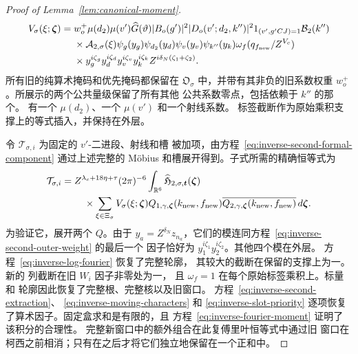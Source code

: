 \documentclass[11pt,a4paper]{article}
\numberwithin{equation}{section}
\numberwithin{figure}{section}
\theoremstyle{definition}
\theoremstyle{remark}
\begin{document}
\begin{proof}[Proof of Lemma~\ref{lem:canonical-moment}]
\begin{equation}
 \begin{split}
 V_\sigma(\xi;\boldsymbol\zeta)={}&w_o^+\mu(d_2)\mu(v')\widehat G(\vartheta)
 |B_o(g')|^2|D_o(v';d_2,k'')|^2
 1_{(v',g'CJ)=1}\mathcal B_2(k'')\\
 &\times\mathcal A_{2,\sigma}(\xi)
 \psi_g(y_g)\psi_{d_2}(y_d)\psi_v(y_v)\psi_{k''}(y_k)
 \omega_f(q_{f_{\rm new}}/Z^{V_c})\\
 &\times y_g^{i\zeta_g}y_d^{i\zeta_d}y_v^{i\zeta_v}y_k^{i\zeta_k}
       Z^{i\delta_N(\zeta_1+\zeta_2)}.
 \end{split}
\end{equation}
所有旧的纯算术掩码和优先掩码都保留在
\(\mathfrak O_\sigma\) 中，并带有其非负的旧系数权重
\(w_o^+\)。所展示的两个公共量级保留了所有其他
公共系数零点，包括依赖于 \(k''\) 的那个。
有一个 \(\mu(d_2)\)、一个 \(\mu(v')\) 和一个射线系数。
标签截断作为原始乘积支撑上的等式插入，并保持在外层。

令 \(\mathcal T_{\sigma,i}\) 为固定的 \(v'\)-二进段、射线和槽
被加项，由方程~\eqref{eq:inverse-second-formal-component}
通过上述完整的 M\"obius 和槽展开得到。子式所需的精确恒等式为
\begin{equation}\label{eq:inverse-xi-identity}
 \begin{split}
 \mathcal T_{\sigma,i}={}&Z^{\lambda_c+18\eta+\tau}(2\pi)^{-6}
 \int_{\mathbb R^6}\widehat{\mathfrak H}_{2,\sigma,\boldsymbol t}
       (\boldsymbol\zeta)\\
 &\quad\times\sum_{\xi\in\Xi_\sigma}V_\sigma(\xi;\boldsymbol\zeta)
 Q_{1,\gamma,\boldsymbol\zeta}(k_{\rm new},f_{\rm new})
 \overline{Q_{2,\gamma,\boldsymbol\zeta}(k_{\rm new},f_{\rm new})}
 \,d\boldsymbol\zeta.
 \end{split}
\end{equation}
为验证它，展开两个 \(Q\)。由于
\(y_a=Z^{\delta_N}z_{n_a}\)，它们的模连同方程~\eqref{eq:inverse-second-outer-weight} 的最后一个
因子恰好为
\(y_1^{i\zeta_1}y_2^{i\zeta_2}\)。其他四个模在外层。
方程~\eqref{eq:inverse-log-fourier} 恢复了完整轮廓，
其较大的截断在保留的支撑上为一。新的
列截断在旧 \(W_i\) 因子非零处为一，
且 \(\omega_f=1\) 在每个原始标签乘积上。标量和
轮廓因此恢复了完整根、完整核以及旧窗口。
方程~\eqref{eq:inverse-second-extraction}、
\eqref{eq:inverse-moving-characters} 和
\eqref{eq:inverse-slot-priority} 逐项恢复了算术因子。固定盒求和是有限的，且
方程~\eqref{eq:inverse-fourier-moment} 证明了该积分的合理性。
完整新窗口中的额外组合在此复傅里叶恒等式中通过旧
窗口在柯西之前相消；只有在之后才将它们独立地保留在一个正和中。


\end{proof}
\end{document}
